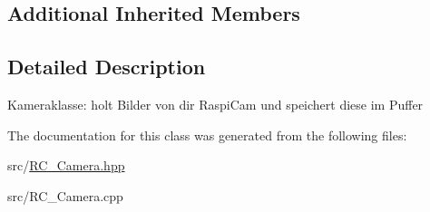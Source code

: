 \subsection*{Additional Inherited Members}


\subsection{Detailed Description}
Kameraklasse\+: holt Bilder von dir Raspi\+Cam und speichert diese im Puffer 

The documentation for this class was generated from the following files\+:\begin{DoxyCompactItemize}
\item 
src/\hyperlink{RC__Camera_8hpp}{R\+C\+\_\+\+Camera.\+hpp}\item 
src/R\+C\+\_\+\+Camera.\+cpp\end{DoxyCompactItemize}
